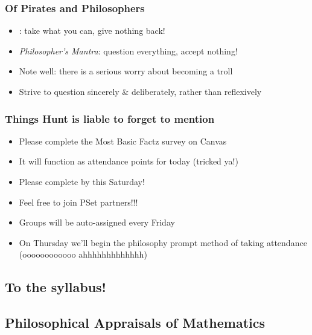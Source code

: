\begin{frame}
\frametitle{Of Pirates and Philosophers}

\begin{itemize}[<+->]

\item {}: take what you can, give nothing back!

\item \emph{Philosopher's Mantra}: question everything, accept nothing!

\item Note well: there is a serious worry about becoming a troll

\item Strive to question sincerely \& deliberately, rather than reflexively

\end{itemize}
\end{frame}

\begin{frame}
\frametitle{Things Hunt is liable to forget to mention}

\begin{itemize}[<+->]

\item Please complete the Most Basic Factz survey on Canvas
\item[] It will function as attendance points for today (tricked ya!)
\item[] Please complete by this Saturday!

\item Feel free to join PSet partners!!! 
\item[] Groups will be auto-assigned every Friday

\item On Thursday we'll begin the philosophy prompt method of taking attendance (oooooooooooo ahhhhhhhhhhhhh)



\end{itemize}
\end{frame}

\subsection{To the syllabus!} 


\subsection{Philosophical Appraisals of Mathematics}

